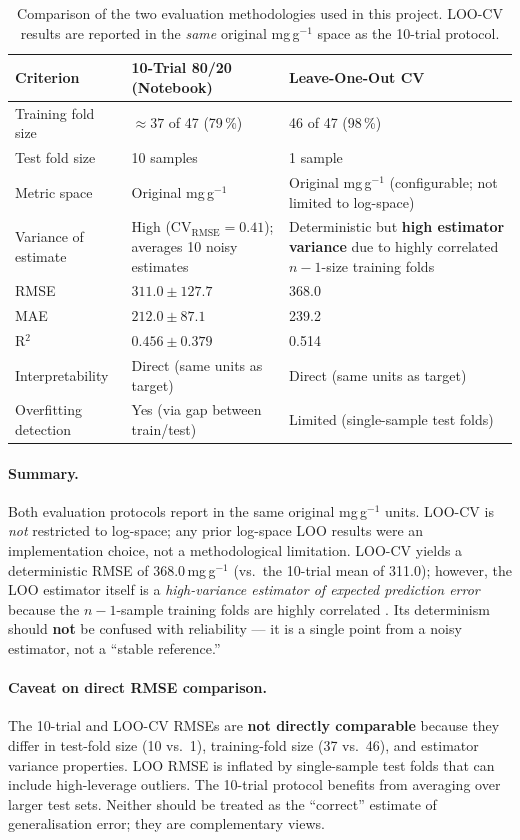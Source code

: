 \documentclass[12pt,a4paper]{article}
\begin{document}
\begin{table}[h]
\centering
\caption{Comparison of the two evaluation methodologies used in this project.
  LOO-CV results are reported in the \emph{same} original mg\,g$^{-1}$
  space as the 10-trial protocol.}
\label{tab:eval_comparison}
\small
\begin{tabular}{p{4cm}p{5.5cm}p{5.5cm}}
\toprule
Criterion & 10-Trial 80/20 (Notebook) & Leave-One-Out CV \\
\midrule
Training fold size & $\approx 37$ of 47 (79\,\%) & 46 of 47 (98\,\%) \\
Test fold size & 10 samples & 1 sample \\
Metric space & Original mg\,g$^{-1}$ & Original mg\,g$^{-1}$ (configurable; not limited to log-space) \\
Variance of estimate & High (CV$_\text{RMSE}=0.41$); averages 10 noisy estimates & Deterministic but \textbf{high estimator variance} due to highly correlated $n{-}1$-size training folds \\
RMSE & $311.0 \pm 127.7$ & 368.0 \\
MAE  & $212.0 \pm 87.1$  & 239.2 \\
R$^2$ & $0.456 \pm 0.379$ & 0.514 \\
Interpretability & Direct (same units as target) & Direct (same units as target) \\
Overfitting detection & Yes (via gap between train/test) & Limited (single-sample test folds) \\
\bottomrule
\end{tabular}
\end{table}

\paragraph{Summary.}
Both evaluation protocols report in the same original mg\,g$^{-1}$
units.  LOO-CV is \emph{not} restricted to log-space; any prior
log-space LOO results were an implementation choice, not a methodological
limitation.  LOO-CV yields a deterministic RMSE of 368.0\,mg\,g$^{-1}$
(vs.\ the 10-trial mean of 311.0); however, the LOO estimator itself is
a \emph{high-variance estimator of expected prediction error}
because the $n-1$-sample training folds are highly correlated
\citep{Hastie2009, Arlot2010}.  Its determinism should \textbf{not} be
confused with reliability — it is a single point from a noisy estimator,
not a ``stable reference.''

\paragraph{Caveat on direct RMSE comparison.}
The 10-trial and LOO-CV RMSEs are \textbf{not directly comparable}
because they differ in test-fold size (10 vs.\ 1), training-fold size
(37 vs.\ 46), and estimator variance properties.  LOO RMSE is inflated
by single-sample test folds that can include high-leverage outliers.
The 10-trial protocol benefits from averaging over larger test sets.
Neither should be treated as the ``correct'' estimate of generalisation
error; they are complementary views.
\end{document}
